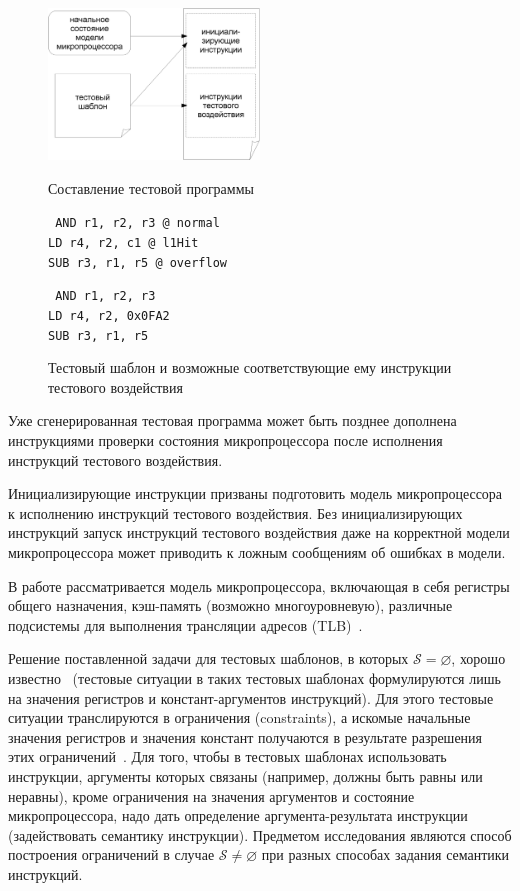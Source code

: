 \begin{figure}[h] \center
  \includegraphics[width=0.5\textwidth]{1.review/problem}\\
  \caption{Составление тестовой программы}\label{problem}
\end{figure}

\begin{figure}[h]
\quad\parbox{0.5\textwidth}{\small \tt
AND r1, r2, r3 @ normal\\
LD r4, r2, c1 @ l1Hit\\
SUB r3, r1, r5 @ overflow } \parbox{0.3\textwidth}{\small \tt
AND r1, r2, r3\\
LD r4, r2, 0x0FA2\\
SUB r3, r1, r5
}
\caption{Тестовый шаблон и возможные соответствующие ему инструкции
тестового воздействия}\label{test_template_exmp}
\end{figure}


Уже сгенерированная тестовая программа может быть позднее дополнена
инструкциями проверки состояния микропроцессора после исполнения
инструкций тестового воздействия.

Инициализирующие инструкции призваны подготовить модель
микропроцессора к исполнению инструкций тестового воздействия. Без
инициализирующих инструкций запуск инструкций тестового воздействия
даже на корректной модели микропроцессора может приводить к ложным
сообщениям об ошибках в модели.

В работе рассматривается модель
микропроцессора, включающая в себя регистры общего назначения,
кэш-память (возможно многоуровневую), различные подсистемы для выполнения
трансляции адресов (TLB)~\cite{HennesyPatterson}.

Решение поставленной задачи для тестовых шаблонов, в которых
$\mathcal{S} = \varnothing$, хорошо известно~\cite{my_syrcose_2008,
my_isp_2008} (тестовые ситуации в таких тестовых шаблонах
формулируются лишь на значения регистров и констант-аргументов
инструкций). Для этого тестовые ситуации транслируются в ограничения
(constraints), а искомые начальные значения регистров и значения
констант получаются в результате разрешения этих
ограничений~\cite{CSP}. Для того, чтобы в тестовых шаблонах
использовать инструкции, аргументы которых связаны (например, должны
быть равны или неравны), кроме ограничения на значения аргументов и
состояние микропроцессора, надо дать определение
аргумента-результата инструкции (задействовать семантику
инструкции). Предметом исследования являются способ построения
ограничений в случае $\mathcal{S} \neq \varnothing$ при разных
способах задания семантики инструкций.

